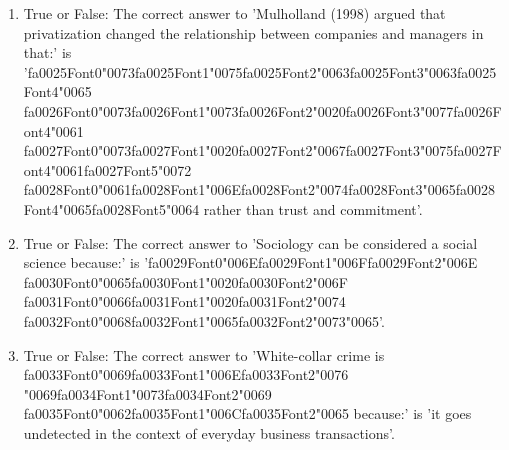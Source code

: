 \documentclass[12pt]{article}
\begin{document}
\begin{enumerate}[label=\arabic*.]
\item True or False: The correct answer to 'Mulholland (1998) argued that privatization changed the relationship between companies and managers in that:' is '{\csname fa0025Font0\endcsname\char"0073}{\csname fa0025Font1\endcsname\char"0075}{\csname fa0025Font2\endcsname\char"0063}{\csname fa0025Font3\endcsname\char"0063}{\csname fa0025Font4\endcsname\char"0065} {\csname fa0026Font0\endcsname\char"0073}{\csname fa0026Font1\endcsname\char"0073}{\csname fa0026Font2\endcsname\char"0020}{\csname fa0026Font3\endcsname\char"0077}{\csname fa0026Font4\endcsname\char"0061} {\csname fa0027Font0\endcsname\char"0073}{\csname fa0027Font1\endcsname\char"0020}{\csname fa0027Font2\endcsname\char"0067}{\csname fa0027Font3\endcsname\char"0075}{\csname fa0027Font4\endcsname\char"0061}{\csname fa0027Font5\endcsname\char"0072} {\csname fa0028Font0\endcsname\char"0061}{\csname fa0028Font1\endcsname\char"006E}{\csname fa0028Font2\endcsname\char"0074}{\csname fa0028Font3\endcsname\char"0065}{\csname fa0028Font4\endcsname\char"0065}{\csname fa0028Font5\endcsname\char"0064} rather than trust and commitment'.
\item True or False: The correct answer to 'Sociology can be considered a social science because:' is '{\csname fa0029Font0\endcsname\char"006E}{\csname fa0029Font1\endcsname\char"006F}{\csname fa0029Font2\endcsname\char"006E} {\csname fa0030Font0\endcsname\char"0065}{\csname fa0030Font1\endcsname\char"0020}{\csname fa0030Font2\endcsname\char"006F} {\csname fa0031Font0\endcsname\char"0066}{\csname fa0031Font1\endcsname\char"0020}{\csname fa0031Font2\endcsname\char"0074} {\csname fa0032Font0\endcsname\char"0068}{\csname fa0032Font1\endcsname\char"0065}{\csname fa0032Font2\endcsname\char"0073}{\char"0065}'.
\item True or False: The correct answer to 'White-collar crime is {\csname fa0033Font0\endcsname\char"0069}{\csname fa0033Font1\endcsname\char"006E}{\csname fa0033Font2\endcsname\char"0076} {\char"0069}{\csname fa0034Font1\endcsname\char"0073}{\csname fa0034Font2\endcsname\char"0069} {\csname fa0035Font0\endcsname\char"0062}{\csname fa0035Font1\endcsname\char"006C}{\csname fa0035Font2\endcsname\char"0065} because:' is 'it goes undetected in the context of everyday business transactions'.

\end{enumerate}
\end{document}
